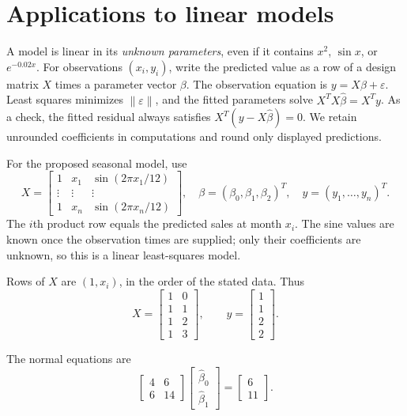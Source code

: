 \section{Applications to linear models}
A model is linear in its \emph{unknown parameters}, even if it contains
$x^2$, $\sin x$, or $e^{-0.02x}$. For observations $(x_i,y_i)$,
write the predicted value as a row of a design matrix $X$ times a
parameter vector $\beta$. The observation equation is
$y=X\beta+\varepsilon$. Least squares minimizes $\|\varepsilon\|$,
and the fitted parameters solve $X^TX\widehat\beta=X^Ty$.
As a check, the fitted residual always satisfies
$X^T(y-X\widehat\beta)=0$. We retain unrounded coefficients in
computations and round only displayed predictions.

For the proposed seasonal model, use
\[
 X=\begin{bmatrix}1&x_1&\sin(2\pi x_1/12)\\
 \vdots&\vdots&\vdots\\1&x_n&\sin(2\pi x_n/12)\end{bmatrix},\quad
 \beta=(\beta_0,\beta_1,\beta_2)^T,\quad y=(y_1,\ldots,y_n)^T.
\]
The $i$th product row equals the predicted sales at month $x_i$.
The sine values are known once the observation times are supplied;
only their coefficients are unknown, so this is a linear least-squares model.

Rows of $X$ are $(1,x_i)$, in the order of the stated data. Thus
\[ X=\begin{bmatrix}1 & 0\\1 & 1\\1 & 2\\1 & 3\end{bmatrix},\qquad y=\begin{bmatrix}1\\1\\2\\2\end{bmatrix}.\]

The normal equations are
\[ \begin{bmatrix}4 & 6\\6 & 14\end{bmatrix}\begin{bmatrix}\widehat\beta_0\\\widehat\beta_1\end{bmatrix}=\begin{bmatrix}6\\11\end{bmatrix}.\]

